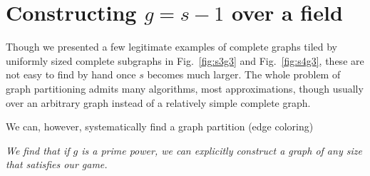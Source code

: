 \documentclass[11pt, oneside]{article} 	%
\begin{document}
\section{Constructing $g = s-1$ over a field}

Though we presented a few legitimate examples of complete graphs tiled by uniformly sized complete subgraphs in Fig.~\ref{fig:s3g3} and Fig.~\ref{fig:s4g3}, these are not easy to find by hand once $s$ becomes much larger.  The whole problem of graph partitioning admits many algorithms, most approximations\cite{3}, though usually over an arbitrary graph instead of a relatively simple complete graph.

We can, however, systematically find a graph partition (edge coloring) 

\emph{We find that if $g$ is a prime power, we can explicitly construct a graph of any size that satisfies our game.}
\end{document}

